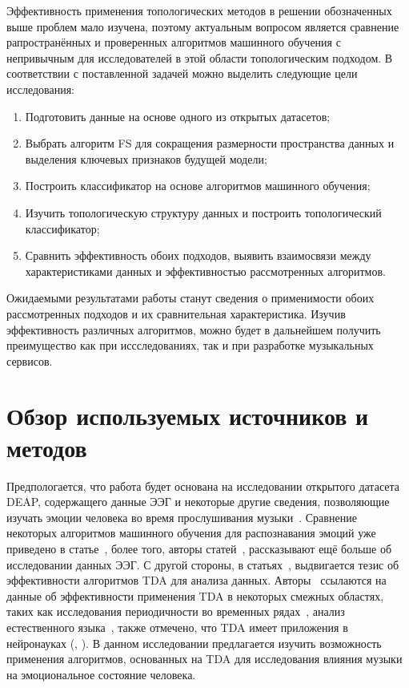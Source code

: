 \documentclass{article}
\begin{document}
Эффективность применения топологических методов в решении обозначенных выше проблем мало изучена, поэтому актуальным вопросом является сравнение рапространённых и проверенных алгоритмов машинного обучения с непривычным для исследователей в этой области топологическим подходом. В соответствии с поставленной задачей можно выделить следующие цели исследования:
\begin{enumerate}
\item Подготовить данные на основе одного из открытых датасетов;
\item Выбрать алгоритм FS для сокращения размерности пространства данных и выделения ключевых признаков будущей модели;
\item Построить классификатор на основе алгоритмов машинного обучения;
\item Изучить топологическую структуру данных и построить топологический классификатор;
\item Сравнить эффективность обоих подходов, выявить взаимосвязи между характеристиками данных и эффективностью рассмотренных алгоритмов.
\end{enumerate}

Ожидаемыми результатами работы станут сведения о применимости обоих рассмотренных подходов и их сравнительная характеристика. Изучив эффективность различных алгоритмов, можно будет в дальнейшем получить преимущество как при иссследованиях, так и при разработке музыкальных сервисов.

\section{Обзор используемых источников и методов}
Предпологается, что работа будет основана на исследовании открытого датасета DEAP, содержащего данные ЭЭГ и некоторые другие сведения, позволяющие изучать эмоции человека во время прослушивания музыки~\cite{Koelstra}. Сравнение некоторых алгоритмов машинного обучения для распознавания эмоций уже приведено в статье~\cite{Nawaz}, более того, авторы статей~\cite{Tandle}, \cite{Scherer} рассказывают ещё больше об исследовании данных ЭЭГ. С другой стороны, в статьях~\cite{Umeda}, \cite{Otter} выдвигается тезис об эффективности алгоритмов TDA для анализа данных. Авторы~\cite{Otter} ссылаются на данные об эффективности применения TDA в некоторых смежных областях, таких как исследования периодичности во временных рядах~\cite{Perea}, анализ естественного языка~\cite{Zhu}, также отмечено, что TDA имеет приложения в нейронауках (\cite{Curto}, \cite{Lord}). В данном исследовании предлагается изучить возможность применения алгоритмов, основанных на TDA для исследования влияния музыки на эмоциональное состояние человека.
\end{document}
